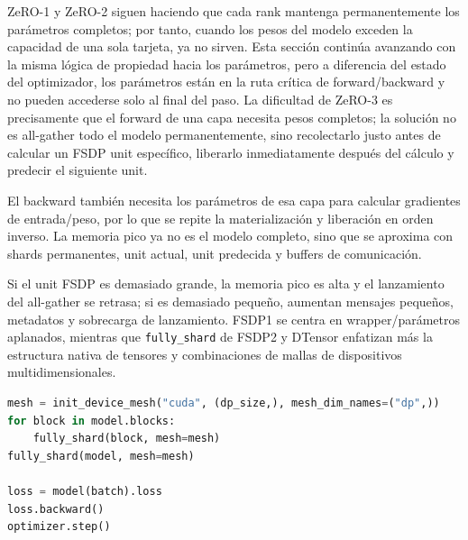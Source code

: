 ZeRO-1 y ZeRO-2 siguen haciendo que cada rank mantenga permanentemente los parámetros completos; por tanto, cuando los pesos del modelo exceden la capacidad de una sola tarjeta, ya no sirven. Esta sección continúa avanzando con la misma lógica de propiedad hacia los parámetros, pero a diferencia del estado del optimizador, los parámetros están en la ruta crítica de forward/backward y no pueden accederse solo al final del paso. La dificultad de ZeRO-3 es precisamente que el forward de una capa necesita pesos completos; la solución no es all-gather todo el modelo permanentemente, sino recolectarlo justo antes de calcular un FSDP unit específico, liberarlo inmediatamente después del cálculo y predecir el siguiente unit.



El backward también necesita los parámetros de esa capa para calcular gradientes de entrada/peso, por lo que se repite la materialización y liberación en orden inverso. La memoria pico ya no es el modelo completo, sino que se aproxima con shards permanentes, unit actual, unit predecida y buffers de comunicación.



Si el unit FSDP es demasiado grande, la memoria pico es alta y el lanzamiento del all-gather se retrasa; si es demasiado pequeño, aumentan mensajes pequeños, metadatos y sobrecarga de lanzamiento. FSDP1 se centra en wrapper/parámetros aplanados, mientras que \texttt{fully\_shard} de FSDP2 y DTensor enfatizan más la estructura nativa de tensores y combinaciones de mallas de dispositivos multidimensionales.


\begin{lstlisting}[language=Python,caption={Esquema de fully\_shard por capa de FSDP2}]
mesh = init_device_mesh("cuda", (dp_size,), mesh_dim_names=("dp",))
for block in model.blocks:
    fully_shard(block, mesh=mesh)
fully_shard(model, mesh=mesh)

loss = model(batch).loss
loss.backward()
optimizer.step()
\end{lstlisting}

